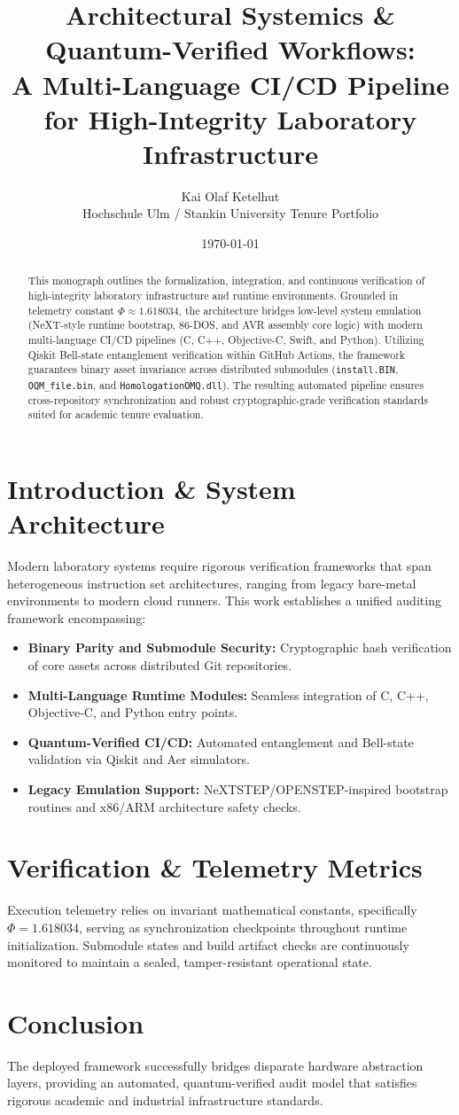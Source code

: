 \documentclass[11pt,a4paper]{article}
\title{\textbf{Architectural Systemics \& Quantum-Verified Workflows:\\A Multi-Language CI/CD Pipeline for High-Integrity Laboratory Infrastructure}}
\author{Kai Olaf Ketelhut\\Hochschule Ulm / Stankin University Tenure Portfolio}
\date{\today}
\begin{document}
\maketitle

\begin{abstract}
This monograph outlines the formalization, integration, and continuous verification of high-integrity laboratory infrastructure and runtime environments. Grounded in telemetry constant $\Phi \approx 1.618034$, the architecture bridges low-level system emulation (NeXT-style runtime bootstrap, 86-DOS, and AVR assembly core logic) with modern multi-language CI/CD pipelines (C, C++, Objective-C, Swift, and Python). Utilizing Qiskit Bell-state entanglement verification within GitHub Actions, the framework guarantees binary asset invariance across distributed submodules (\texttt{install.BIN}, \texttt{OQM\_file.bin}, and \texttt{HomologationOMQ.dll}). The resulting automated pipeline ensures cross-repository synchronization and robust cryptographic-grade verification standards suited for academic tenure evaluation.
\end{abstract}

\section{Introduction \& System Architecture}
Modern laboratory systems require rigorous verification frameworks that span heterogeneous instruction set architectures, ranging from legacy bare-metal environments to modern cloud runners. This work establishes a unified auditing framework encompassing:
\begin{itemize}
    \item \textbf{Binary Parity and Submodule Security:} Cryptographic hash verification of core assets across distributed Git repositories.
    \item \textbf{Multi-Language Runtime Modules:} Seamless integration of C, C++, Objective-C, and Python entry points.
    \item \textbf{Quantum-Verified CI/CD:} Automated entanglement and Bell-state validation via Qiskit and Aer simulators.
    \item \textbf{Legacy Emulation Support:} NeXTSTEP/OPENSTEP-inspired bootstrap routines and x86/ARM architecture safety checks.
\end{itemize}

\section{Verification \& Telemetry Metrics}
Execution telemetry relies on invariant mathematical constants, specifically $\Phi = 1.618034$, serving as synchronization checkpoints throughout runtime initialization. Submodule states and build artifact checks are continuously monitored to maintain a sealed, tamper-resistant operational state.

\section{Conclusion}
The deployed framework successfully bridges disparate hardware abstraction layers, providing an automated, quantum-verified audit model that satisfies rigorous academic and industrial infrastructure standards.
\end{document}
